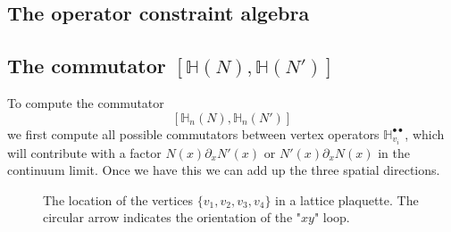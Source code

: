 \documentclass[12pt]{article}
\newcommand{\pa}{\partial}
\begin{document}
\begin{appendix}


\section{The operator constraint algebra}



\subsection{The commutator $[\mathds{H}(N),\mathds{H}(N')]$}
\label{appendixham}







To compute the commutator 
\begin{equation}
\left[\mathds{H}_n(N), \mathds{H}_n(N')\right]
\label{maaan}
\end{equation}
we first compute all possible commutators between vertex operators $\mathds{H}^{\bullet\bullet}_{v_i}$, which will contribute with a factor $N(x)\pa_x N'(x)$ or $N'(x)\pa_x N(x)$ in the continuum limit. Once we have this we can add up the three spatial directions.

\begin{figure}[t]
\begin{center}
\resizebox{!}{6cm}{
 }
\end{center}
\caption{The location of the vertices $\{v_1,v_2,v_3,v_4\}$ in a lattice plaquette. The circular arrow indicates the orientation of the "$xy$" loop.}
\label{leningrad}
\end{figure}





\end{appendix}
\end{document}
